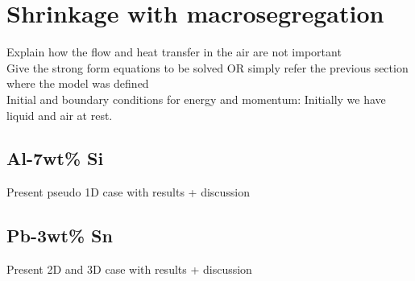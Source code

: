 \section{Shrinkage with macrosegregation}
Explain how the flow and heat transfer in the air are not important \\ 
Give the strong form equations to be solved OR simply refer the previous section where the model was defined \\
Initial and boundary conditions for energy and momentum:  Initially we have liquid and air at rest. 
\subsection{Al-7wt\% Si}
Present pseudo 1D case with results + discussion
\subsection{Pb-3wt\% Sn}
Present 2D and 3D case with results + discussion

